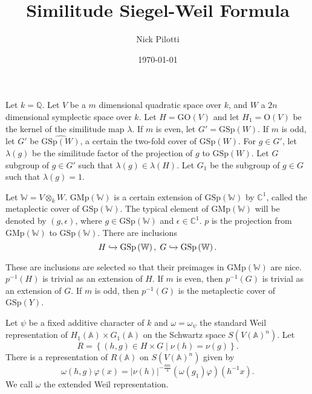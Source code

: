 \documentclass[12pt]{article}
\title{Similitude Siegel-Weil Formula}
\author{Nick Pilotti}
\date{\today}
\begin{document}
\maketitle

Let $k = \mathbb{Q}$. Let $V$ be a $m$ dimensional quadratic space over $k$, and
$W$ a $2n$ dimensional symplectic space over $k$. Let $H =
\text{GO}\left(V\right)$ and let $H_{1} = \text{O}\left(V\right)$ be the kernel
of the similitude map $\lambda$. If $m$ is even, let $G' =
\text{GSp}\left(W\right)$. If $m$ is odd, let $G'$ be
$\widehat{\text{GSp}\left(W\right)}$, a certain the two-fold cover of
$\text{GSp}\left(W\right)$. For $g \in G'$, let $\lambda\left(g\right)$ be the
similitude factor of the projection of $g$ to $\text{GSp}\left(W\right)$. Let
$G$ subgroup of $g \in G'$ such that $\lambda\left(g\right) \in
\lambda\left(H\right)$. Let $G_1$ be the subgroup of $g \in G$ such that
$\lambda\left(g\right) = 1$.

Let $\mathbb{W} = V \otimes_{k} W$. $\text{GMp}\left(\mathbb{W}\right)$ is a
certain extension of $\text{GSp}\left(\mathbb{W}\right)$ by $\mathbb{C}^{1}$,
called the metaplectic cover of $\text{GSp}\left(\mathbb{W}\right)$. The typical
element of $\text{GMp}\left(\mathbb{W}\right)$ will be denoted by $\left(g,
\epsilon\right)$, where $g \in \text{GSp}\left(\mathbb{W}\right)$ and $\epsilon
\in \mathbb{C}^{1}$. $p$ is the projection from
$\text{GMp}\left(\mathbb{W}\right)$ to $\text{GSp}\left(\mathbb{W}\right)$.
There are inclusions 
%
\[H \xhookrightarrow{} \text{GSp}\left(\mathbb{W}\right), \; G
\xhookrightarrow{} \text{GSp}\left(\mathbb{W}\right).\]
%

These are inclusions are selected so that their preimages in
$\text{GMp}\left(\mathbb{W}\right)$ are nice. $p^{-1}\left(H\right)$ is trivial
as an extension of $H$. If $m$ is even, then
$p^{-1}\left(G\right)$ is trivial as an extension of $G$. If $m$ is odd, then
$p^{-1}\left(G\right)$ is the metaplectic cover of $\text{GSp}\left(Y\right)$.

Let $\psi$ be a fixed additive character of $k$ and $\omega = \omega_{\psi}$ the
standard Weil representation of $H_{1}\left(\mathbb{A}\right) \times
G_{1}\left(\mathbb{A}\right)$ on the Schwartz space
$S\left(V\left(\mathbb{A}\right)^{n}\right)$. Let 
%
\[R = \left\{\left(h, g\right) \in H \times G \; | \; \nu\left(h\right) =
\nu\left(g\right)\right\}.\]
%
There is a representation of $R\left(\mathbb{A}\right)$ on
$S\left(V\left(\mathbb{A}\right)^{n}\right)$ given by 
%
\[\omega\left(h, g\right)\varphi\left(x\right) =
\left|\nu\left(h\right)\right|^{-\frac{nm}{4}}\left(\omega\left(g_1\right)\varphi\right)\left(h^{-1}x\right).\]
%
We call $\omega$ the extended Weil representation.
\end{document}
